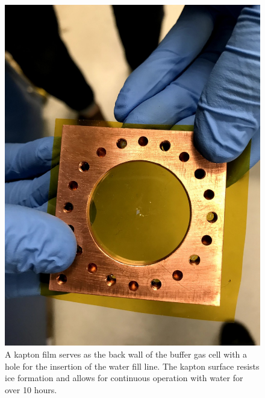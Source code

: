 \begin{figure}[H]
	\centering
	\includegraphics[width=.7\textwidth]{images/CBGB_kapton.jpg}
	\caption{A kapton film serves as the back wall of the buffer gas cell with a hole for the insertion of the water fill line. The kapton surface resists ice formation and allows for continuous operation with water for over 10 hours.}
	\label{fig: kapton}
\end{figure}